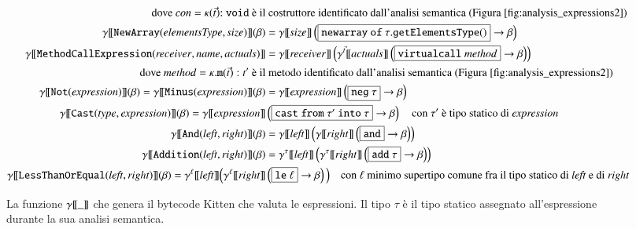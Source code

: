\begin{figure}[t]
{\begin{align*}
  \text{dove $\mathit{con}=\kappa(\vec{t})\mathtt{:void}$ \e il}&
  \text{ costruttore identificato dall'analisi semantica
        (Figura~\ref{fig:analysis_expressions2})}\\
  \gen{\mathtt{NewArray(\mathit{elementsType},\mathit{size})}}(\beta)
    &=\gen{\mathit{size}}
    \left(\fbox{$\mathtt{newarray\ of\ }\tau\mathtt{.getElementsType()}$}
    \to\beta\right)\\
  \gen{\mathtt{MethodCallExpression(\mathit{receiver},\mathit{name},
    \mathit{actuals})}}&=\gen{\mathit{receiver}}\left(
    \gentwo{\vec{t}}{\mathit{actuals}}
    \left(\fbox{$\mathtt{virtualcall}\ \mathit{method}$}
    \to\beta\right)\right)\\
  \text{dove $\mathit{method}=\kappa.\mathtt{m}(\vec{t}):t'$
        \`e il}&
  \text{ metodo identificato dall'analisi semantica
        (Figura~\ref{fig:analysis_expressions2})}\\
  \gen{\mathtt{Not(\mathit{expression})}}(\beta)=
    \gen{\mathtt{Minus(\mathit{expression})}}(\beta)&=
    \gen{\mathit{expression}}\left(
    \fbox{$\mathtt{neg\ }\tau$}\to\beta\right)\\
  \gen{\mathtt{Cast(\mathit{\mathit{type},\mathit{expression}})}}(\beta)=
      \gen{\mathit{expression}}&
        \left(\fbox{$\mathtt{cast\ from\ }\tau'\mathtt{\ into\ }\tau$}
        \to\beta\right)
  \quad\text{con $\tau'$ \e tipo statico di }\mathit{expression}\\
  \gen{\mathtt{And(\mathit{left},\mathit{right})}}(\beta)&=
    \gen{\mathit{left}}\left(
      \gen{\mathit{right}}\left(\fbox{$\mathtt{and}$}\to\beta\right)\right)\\
  \gen{\mathtt{Addition(\mathit{left},\mathit{right})}}(\beta)&=
    \gentwo{\tau}{\mathit{left}}\left(
      \gentwo{\tau}{\mathit{right}}\left(\fbox{$\mathtt{add}\ \tau$}
      \to\beta\right)\right)\\
  \gen{\mathtt{LessThanOrEqual(\mathit{left},\mathit{right})}}(\beta)=
    \gentwo{\ell}{\mathit{left}}\Big(
      \gentwo{\ell}{\mathit{right}}&\left(\fbox{$\mathtt{le}\ \ell$}
      \to\beta\right)\Big)\quad
  \text{con $\ell$ minimo supertipo comune fra il tipo statico di
    $\mathit{left}$ e di $\mathit{right}$}
\end{align*}
}
\caption{La funzione ${\gamma[\![{\_}]\!]}$ che genera il bytecode Kitten che valuta le espressioni. Il tipo $\tau$ \`e il tipo statico assegnato all'espressione durante la sua analisi semantica.}
  \label{fig:expressions_generation}
\end{figure}

